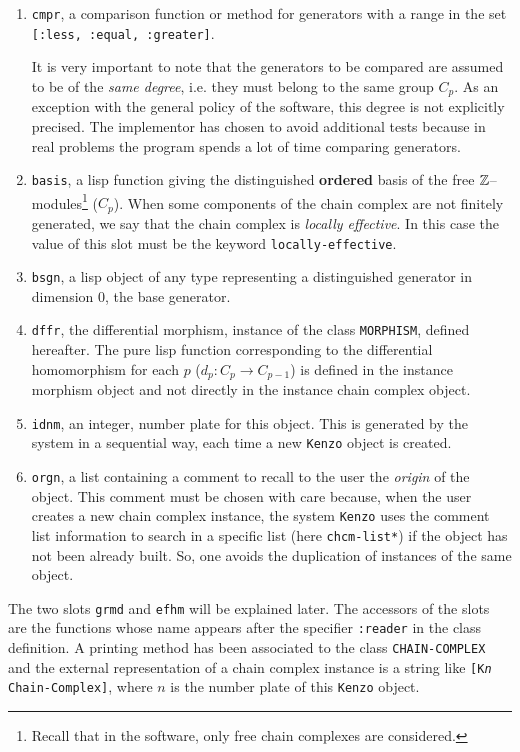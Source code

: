 \begin{enumerate}
\item {\tt cmpr}, a comparison function or method for  generators with a range in the set
{\tt [:less, :equal, :greater]}.
\par
It is very important to note that the generators to be compared are assumed to be
of the {\em same degree}, i.e. they must belong to the same group $C_p$. As an exception with
the general policy of the software, this degree is not explicitly precised.
The implementor has chosen to avoid additional tests because in real problems the program spends
a lot of time comparing generators.
\item {\tt basis}, a lisp function giving the distinguished {\bf ordered} basis of the free ${\mathbb{Z}}$--modules\footnote{
Recall that in the software, only free chain complexes are considered.} ($C_p$).  When
some  components of the chain complex  are not finitely generated, we say that the chain complex
is {\em locally effective}. In this case the value of this slot must be the keyword
{\tt locally-effective}.
\item {\tt bsgn}, a lisp object of any type representing a distinguished generator in dimension $0$, the
base generator.
\item {\tt dffr}, the differential morphism, instance of the class {\tt MORPHISM}, defined hereafter.
The pure lisp function corresponding to the differential homomorphism
for each $p$ ($d_p : C_p \rightarrow C_{p-1}$) is defined in the instance morphism  object and
not directly in the instance chain complex object.
\item {\tt idnm}, an integer, number plate for this object. This is generated by
the system in a sequential way, each time a new {\tt Kenzo} object is created.
\item {\tt orgn}, a list containing a comment to recall to the user the {\em origin} of
the object. This comment must be chosen with care because, when the user creates a new chain complex instance,
the  system {\tt Kenzo} uses the comment list information to search
in a specific list (here {\tt *chcm-list*}) if the object has not been already built. So, one avoids
the  duplication of instances of the same object.
\end{enumerate}
The two slots {\tt grmd} and {\tt efhm} will be explained later.
The accessors of the slots are the functions whose name appears after the specifier {\tt:reader} in
the class definition. A printing method has been associated to the class {\tt CHAIN-COMPLEX}
and the external representation of a chain complex instance is a string like {\tt [K{\em n} Chain-Complex]},
where $n$ is the number plate of this {\tt Kenzo} object.

